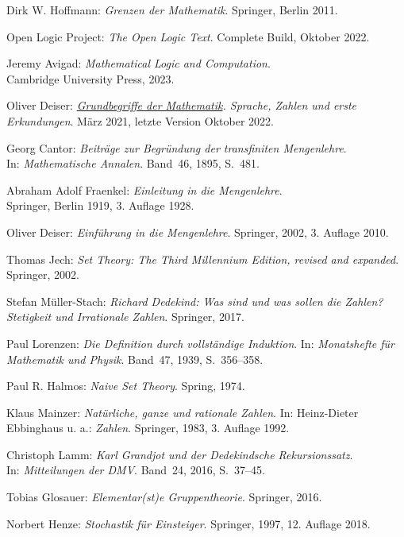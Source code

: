 \begin{thebibliography}{00}
Dirk W. Hoffmann: \emph{Grenzen der Mathematik}.
Springer, Berlin 2011.

 Open Logic Project:
\emph{The Open Logic Text}. Complete Build, Oktober 2022.

 Jeremy Avigad:
\emph{Mathematical Logic and Computation}.\\
Cambridge University Press, 2023.

Oliver Deiser:
\emph{\href{https://www.aleph1.info/?call=Puc&permalink=grundbegriffe}%
{Grundbegriffe der Mathematik}. Sprache, Zahlen und erste
Erkundungen}. März 2021, letzte Version Oktober 2022.

 Georg Cantor:
\emph{Beiträge zur Begründung der transfiniten Mengenlehre}.\\
In: \emph{Mathematische Annalen}. Band~46, 1895, S.~481.

 Abraham Adolf Fraenkel:
\emph{Einleitung in die Mengenlehre}.\\
Springer, Berlin 1919, 3. Auflage 1928.

 Oliver Deiser:
\emph{Einführung in die Mengenlehre}.
Springer, 2002, 3. Auflage 2010.

 Thomas Jech: \emph{Set Theory: The Third Millennium
Edition, revised and expanded}. Springer, 2002.

 Stefan Müller-Stach:
\emph{Richard Dedekind: Was sind und was sollen die Zahlen?
Stetigkeit und Irrationale Zahlen}. Springer, 2017.

 Paul Lorenzen:
\emph{Die Definition durch vollständige Induktion}.
In: \emph{Monatshefte für Mathematik und Physik}.
Band~47, 1939, S.~356--358.

 Paul R. Halmos:
\emph{Naive Set Theory}. Spring, 1974.

 Klaus Mainzer:
\emph{Natürliche, ganze und rationale Zahlen}.
In: Heinz-Dieter Ebbinghaus u. a.: \emph{Zahlen}.
Springer, 1983, 3. Auflage 1992.

 Christoph Lamm:
\emph{Karl Grandjot und der Dedekindsche Rekursionssatz}.\\
In: \emph{Mitteilungen der DMV}. Band~24, 2016, S.~37--45.

 Tobias Glosauer:
\emph{Elementar(st)e Gruppentheorie}.
Springer, 2016.

 Norbert Henze: \emph{Stochastik für Einsteiger}.
Springer, 1997, 12. Auflage 2018.
\end{thebibliography}

